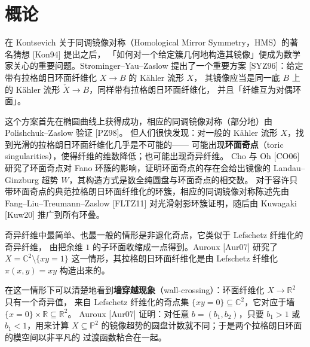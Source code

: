 
\section*{概论}

在 Kontsevich 关于同调镜像对称（Homological Mirror Symmetry，HMS）的著名猜想 [Kon94] 提出之后，
「如何对一个给定簇几何地构造其镜像」便成为数学家关心的重要问题。Strominger--Yau--Zaslow
提出了一个重要方案 [SYZ96]：给定带有拉格朗日环面纤维化 $X\to B$ 的 Kähler 流形 $X$，
其镜像应当是同一底 $B$ 上的 Kähler 流形 $\check{X}\to B$，同样带有拉格朗日环面纤维化，
并且「纤维互为对偶环面」。


这个方案首先在椭圆曲线上获得成功，相应的同调镜像对称（部分地）由 Polishchuk--Zaslow 验证 [PZ98]。
但人们很快发现：对一般的 Kähler 流形 $X$，找到光滑的拉格朗日环面纤维化几乎是不可能的——
可能出现\textbf{环面奇点}（toric singularities），使得纤维的维数降低；也可能出现奇异纤维。
Cho 与 Oh [CO06] 研究了环面奇点对 Fano 环簇的影响，证明环面奇点的存在会给出镜像的
Landau--Ginzburg 超势 $W$，其构造方式是数全纯圆盘与环面奇点的相交数。
对于容许只带环面奇点的典范拉格朗日环面纤维化的环簇，相应的同调镜像对称陈述先由
Fang--Liu--Treumann--Zaslow [FLTZ11] 对光滑射影环簇证明，随后由 Kuwagaki [Kuw20] 推广到所有环叠。


奇异纤维中最简单、也最一般的情形是非退化奇点，它类似于 Lefschetz 纤维化的奇异纤维，
由把余维 $1$ 的子环面收缩成一点得到。Auroux [Aur07] 研究了 $X=\mathbb{C}^2\setminus\{xy=1\}$
这一情形，其拉格朗日环面纤维化是由 Lefschetz 纤维化 $\pi(x,y)=xy$ 构造出来的。

在这一情形下可以清楚地看到\textbf{墙穿越现象}（wall-crossing）：环面纤维化 $X\to\mathbb{R}^2$ 只有一个奇异值，
来自 Lefschetz 纤维化的奇点集 $\{xy=0\}\subseteq\mathbb{C}^2$，它对应于墙 $\{x=0\}\times\mathbb{R}\subseteq\mathbb{R}^2$。
Auroux [Aur07] 证明：对任意 $b=(b_1,b_2)$，只要 $b_1>1$ 或 $b_1<1$，用来计算
$X\subseteq\mathbb{P}^2$ 的镜像超势的圆盘计数就不同；于是两个拉格朗日环面的模空间以非平凡的
过渡函数粘合在一起。

